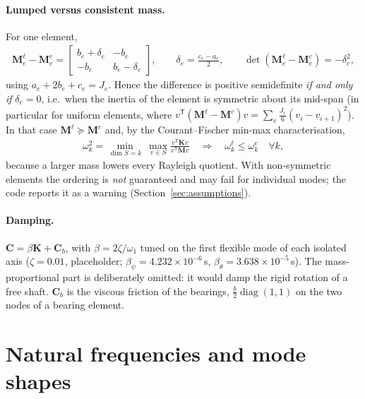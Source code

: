 \documentclass[10pt,a4paper]{article}
\numberwithin{equation}{section}
\begin{document}
\paragraph{Lumped versus consistent mass.} For one element,
\begin{gather}
\mathbf M_e^{\ell} - \mathbf M_e^{c} = \begin{bmatrix} b_e + \delta_e & -b_e \\ -b_e & b_e - \delta_e\end{bmatrix}, \qquad \delta_e = \frac{c_e - a_e}{2}, \qquad
\det\left(\mathbf M_e^{\ell} - \mathbf M_e^{c}\right) = -\delta_e^2 ,
\end{gather}
using $a_e + 2b_e + c_e = J_e$. Hence the difference is positive semidefinite \emph{if and only if} $\delta_e = 0$, i.e.\ when the inertia of the element is symmetric about its mid-span (in particular for uniform elements, where $v^{\mathsf T}(\mathbf M^{\ell}-\mathbf M^{c})v = \sum_e \frac{J_e}{6}(v_i - v_{i+1})^2$). In that case $\mathbf M^{\ell}\succeq\mathbf M^{c}$ and, by the Courant--Fischer min-max characterisation,
\begin{gather}
\omega_k^2 = \min_{\dim S = k}\ \max_{v\in S}\frac{v^{\mathsf T}\mathbf K v}{v^{\mathsf T}\mathbf M v}\quad\Longrightarrow\quad \omega_k^{\ell} \le \omega_k^{c}\quad\forall k,
\end{gather}
because a larger mass lowers every Rayleigh quotient. With non-symmetric elements the ordering is \emph{not} guaranteed and may fail for individual modes; the code reports it as a warning (Section~\ref{sec:assumptions}).
\paragraph{Damping.} $\mathbf C = \beta\mathbf K + \mathbf C_b$, with $\beta = 2\zeta/\omega_1$ tuned on the first flexible mode of each isolated axis ($\zeta = 0.01$, placeholder; $\beta_\psi = 4.232\times10^{-6}$\,s, $\beta_\theta = 3.638\times10^{-5}$\,s). The mass-proportional part is deliberately omitted: it would damp the rigid rotation of a free shaft. $\mathbf C_b$ is the viscous friction of the bearings, $\frac{b}{2}\operatorname{diag}(1,1)$ on the two nodes of a bearing element.
\section{Natural frequencies and mode shapes}\label{sec:eigen}
\end{document}
